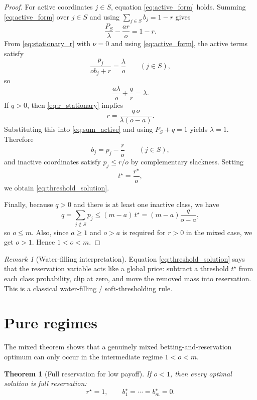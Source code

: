 \documentclass[11pt]{article}
\newtheorem{theorem}{Theorem}
\theoremstyle{remark}
\newtheorem{remark}{Remark}
\begin{document}
\begin{proof}
For active coordinates $j\in S$, equation \eqref{eq:active_form} holds. Summing \eqref{eq:active_form} over $j\in S$ and using $\sum_{j\in S} b_j = 1-r$ gives
\begin{equation}
\frac{P_S}{\lambda}-\frac{a r}{o}=1-r.
\label{eq:sum_active}
\end{equation}
From \eqref{eq:stationary_r} with $\nu=0$ and using \eqref{eq:active_form}, the active terms satisfy
\[
\frac{p_j}{o b_j+r}=\frac{\lambda}{o}
\qquad (j\in S),
\]
so
\begin{equation}
\frac{a\lambda}{o}+\frac{q}{r}=\lambda.
\label{eq:r_stationary}
\end{equation}
If $q>0$, then \eqref{eq:r_stationary} implies
\[
r=\frac{q\,o}{\lambda(o-a)}.
\]
Substituting this into \eqref{eq:sum_active} and using $P_S+q=1$ yields $\lambda=1$. Therefore
\[
b_j=p_j-\frac{r}{o}
\qquad (j\in S),
\]
and inactive coordinates satisfy $p_j\le r/o$ by complementary slackness. Setting
\[
t^\star=\frac{r^\star}{o},
\]
we obtain \eqref{eq:threshold_solution}.

Finally, because $q>0$ and there is at least one inactive class, we have
\[
q=\sum_{j\notin S} p_j
\le (m-a)\,t^\star
=
(m-a)\frac{q}{o-a},
\]
so $o\le m$. Also, since $a\ge 1$ and $o>a$ is required for $r>0$ in the mixed case, we get $o>1$. Hence $1<o<m$.
\end{proof}

\begin{remark}[Water-filling interpretation]
Equation \eqref{eq:threshold_solution} says that the reservation variable acts like a global price:
subtract a threshold $t^\star$ from each class probability, clip at zero, and move the removed mass into reservation.
This is a classical water-filling / soft-thresholding rule.
\end{remark}

\section{Pure regimes}

The mixed theorem shows that a genuinely mixed betting-and-reservation optimum can only occur in the intermediate regime $1<o<m$.

\begin{theorem}[Full reservation for low payoff]
If $o<1$, then every optimal solution is full reservation:
\[
r^\star=1,
\qquad
b_1^\star=\cdots=b_m^\star=0.
\]
\end{theorem}
\end{document}
